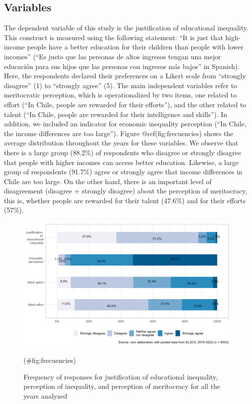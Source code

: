 \documentclass[
  12pt,
  a4paper,
]{article}
\begin{document}
\hypertarget{variables}{%
\subsection{Variables}\label{variables}}

The dependent variable of this study is the justification of educational
inequality. This construct is measured using the following statement:
``It is just that high-income people have a better education for their
children than people with lower incomes'' (``Es justo que las personas
de altos ingresos tengan una mejor educación para sus hijos que las
personas con ingresos más bajos'' in Spanish). Here, the respondents
declared their preferences on a Likert scale from ``strongly disagree''
(1) to ``strongly agree'' (5). The main independent variables refer to
meritocratic perception, which is operationalized by two items, one
related to effort (``In Chile, people are rewarded for their efforts''),
and the other related to talent (``In Chile, people are rewarded for
their intelligence and skills''). In addition, we included an indicator
for economic inequality perception (``In Chile, the income differences
are too large''). Figure @ref(fig:frecuencies) shows the average
distribution throughout the years for these variables. We observe that
there is a large group (88.2\%) of respondents who disagree or strongly
disagree that people with higher incomes can access better education.
Likewise, a large group of respondents (91.7\%) agree or strongly agree
that income differences in Chile are too large. On the other hand, there
is an important level of disagreement (disagree + strongly disagree)
about the perception of meritocracy, this is, whether people are
rewarded for their talent (47.6\%) and for their efforts (57\%).

\begin{figure}[H]

{\centering \includegraphics[width=0.85\linewidth]{output/graphs/merit_plot} 

}

\caption{Frequency of responses for justification of educational inequality, perception of inequality, and perception of meritocracy for all the years analyzed}(\#fig:frecuencies)
\end{figure}
\end{document}
